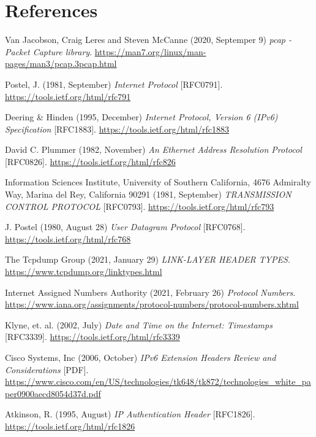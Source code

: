 \documentclass[12pt]{article}
\begin{document}
\section{References}
\label{cit1} \noindent [1] \tabto{2em} Van Jacobson, Craig Leres and Steven McCanne (2020, Septemper 9) \textit{pcap - Packet Capture library}. \url{https://man7.org/linux/man-pages/man3/pcap.3pcap.html}

\label{cit2} \noindent [2] \tabto{2em} Postel, J. (1981, September) \textit{Internet Protocol} [RFC0791]. \url{https://tools.ietf.org/html/rfc791}

\label{cit3} \noindent [3] \tabto{2em} Deering \& Hinden (1995, December) \textit{Internet Protocol, Version 6 (IPv6) Specification} [RFC1883]. \url{https://tools.ietf.org/html/rfc1883}

\label{cit4} \noindent [4] \tabto{2em} David C. Plummer (1982, November) \textit{An Ethernet Address Resolution Protocol} [RFC0826]. \url{https://tools.ietf.org/html/rfc826}

\label{cit5} \noindent [5] \tabto{2em} Information Sciences Institute, University of Southern California, 4676 Admiralty Way, Marina del Rey, California  90291 (1981, September) \textit{TRANSMISSION CONTROL PROTOCOL} [RFC0793]. \url{https://tools.ietf.org/html/rfc793}

\label{cit6} \noindent [6] \tabto{2em} J. Postel (1980, August 28) \textit{User Datagram Protocol} [RFC0768]. \url{https://tools.ietf.org/html/rfc768}

\label{cit7} \noindent [7] \tabto{2em} The Tcpdump Group (2021, January 29) \textit{LINK-LAYER HEADER TYPES}. \url{https://www.tcpdump.org/linktypes.html}

\label{cit8} \noindent [8] \tabto{2em} Internet Assigned Numbers Authority (2021, February 26) \textit{Protocol Numbers}. \url{https://www.iana.org/assignments/protocol-numbers/protocol-numbers.xhtml}

\label{cit9} \noindent [9] \tabto{2em} Klyne, et. al. (2002, July) \textit{Date and Time on the Internet: Timestamps} [RFC3339]. \url{https://tools.ietf.org/html/rfc3339}

\label{cit10} \noindent [10] \tabto{2em} Cisco Systems, Inc (2006, October) \textit{IPv6 Extension Headers Review and Considerations} [PDF]. \url{https://www.cisco.com/en/US/technologies/tk648/tk872/technologies_white_paper0900aecd8054d37d.pdf}

\label{cit11} \noindent [11] \tabto{2em} Atkinson, R. (1995, August) \textit{IP Authentication Header} [RFC1826]. \url{https://tools.ietf.org/html/rfc1826}
\end{document}
